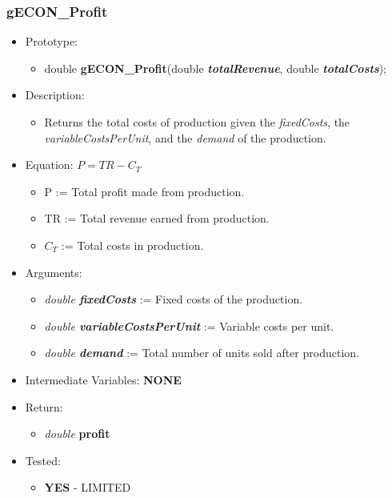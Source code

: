 \documentclass{article}
\begin{document}
{{{{{{\subsubsection{gECON\_Profit}

\begin{itemize}
\item Prototype:
	\begin{itemize}
	\item double \textbf{gECON\_Profit}(double \textbf{\textit{totalRevenue}}, double \textbf{\textit{totalCosts}});
	\end{itemize}
\item Description:
	\begin{itemize}
	\item Returns the total costs of production given the \textit{fixedCosts}, the \textit{variableCostsPerUnit}, and the \textit{demand} of the production.
	\end{itemize}
\item Equation:     $P = TR - C_T$
	\begin{itemize}[noitemsep]
	\item P := Total profit made from production.
	\item TR := Total revenue earned from production.
	\item $C_T$ := Total costs in production.
	\end{itemize}
\item Arguments:
	\begin{itemize}[noitemsep]
	\item \textit{double \textbf{fixedCosts}} := Fixed costs of the production.
	\item \textit{double \textbf{variableCostsPerUnit}} := Variable costs per unit.
	\item \textit{double \textbf{demand}} := Total number of units sold after production.
	\end{itemize} 
\item Intermediate Variables: \textbf{NONE}
\item Return:
	\begin{itemize}
	\item \textit{double} \textbf{profit}
	\end{itemize}
\item Tested:
	\begin{itemize}
	\item \textbf{YES} - LIMITED
	\end{itemize}
\end{itemize}

}}}}}}
\end{document}
